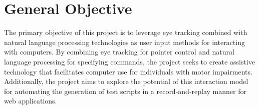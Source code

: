 \section{General Objective}


The primary objective of this project is to leverage eye tracking combined with natural language processing technologies as user input methods for interacting with computers. By combining eye tracking for pointer control and natural language processing for specifying commands, the project seeks to create assistive technology that facilitates computer use for individuals with motor impairments. Additionally, the project aims to explore the potential of this interaction model for automating the generation of test scripts in a record-and-replay manner for web applications.

